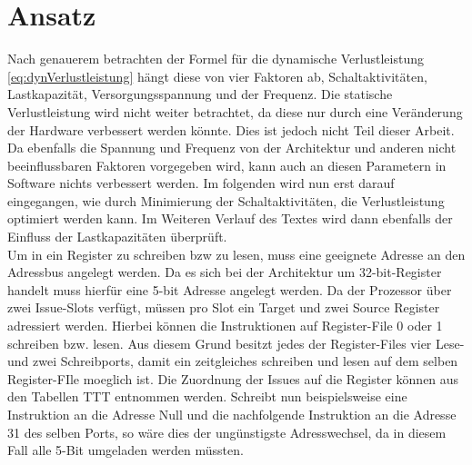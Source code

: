 \section{Ansatz}
Nach genauerem betrachten der Formel für die dynamische Verlustleistung \ref{eq:dynVerlustleistung} hängt diese von vier Faktoren ab, Schaltaktivitäten,  Lastkapazität, Versorgungsspannung und der Frequenz. Die statische Verlustleistung wird nicht weiter betrachtet, da diese nur durch eine Veränderung der Hardware verbessert werden könnte. Dies ist jedoch nicht Teil dieser Arbeit. Da ebenfalls die Spannung und Frequenz von der Architektur und anderen nicht beeinflussbaren Faktoren vorgegeben wird, kann auch an diesen Parametern in Software nichts verbessert werden. Im folgenden wird nun erst darauf eingegangen, wie durch Minimierung der Schaltaktivitäten, die Verlustleistung optimiert werden kann. Im Weiteren Verlauf des Textes wird dann ebenfalls der Einfluss der Lastkapazitäten überprüft.\\
Um in ein Register zu schreiben bzw zu lesen, muss eine geeignete Adresse an den Adressbus angelegt werden. Da es sich bei der Architektur um 32-bit-Register handelt muss hierfür eine 5-bit Adresse angelegt werden.
Da der Prozessor über zwei Issue-Slots verfügt, müssen pro Slot ein Target und zwei Source Register adressiert werden. Hierbei können die Instruktionen auf Register-File 0 oder 1 schreiben bzw. lesen. Aus diesem Grund besitzt jedes der Register-Files vier Lese- und zwei Schreibports, damit ein zeitgleiches schreiben und lesen auf dem selben Register-FIle moeglich ist. Die Zuordnung der Issues auf die Register können aus den Tabellen TTT entnommen werden. Schreibt nun beispielsweise eine Instruktion an die Adresse Null und die nachfolgende Instruktion an die Adresse 31 des selben Ports, so wäre dies der ungünstigste Adresswechsel, da in diesem Fall alle 5-Bit umgeladen werden müssten.

